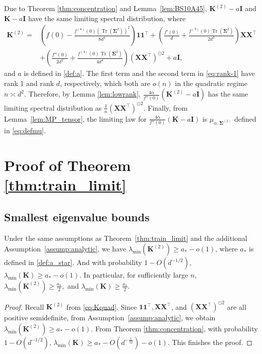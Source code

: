 \documentclass[twoside,11pt]{article}
\def\bI{{\mathbf I}}
\def\bK{{\boldsymbol K}}
\def\bX{{\boldsymbol X}}
\def\bSigma{{\boldsymbol \Sigma}}
\newcommand{\bKquad}{\bK^{(2)}}
\renewcommand{\bK}{\boldsymbol{K}}
\newcommand{\Tr}{\operatorname{Tr}}
\newcommand{\1}{\mathbf{1}}
\def\tran{^\top}
\def\one{\mathbf{1}}
\newenvironment{proofoftheorem}[1]{\par\noindent{\bf Proof of Theorem #1\ }}{\hfill\BlackBox\\[2mm]}
\begin{document}
\begin{proofoftheorem}{\ref{thm:globallaw}}
Due to Theorem \ref{thm:concentration} and Lemma~\ref{lem:BS10A45}, $\bK^{(2)}-a \bI$ and $\bK-a\bI$ have the same limiting spectral distribution, where 
\begin{align} 
\bK^{(2)}=   &\left(f(0)-\frac{f^{(4)}(0)(\Tr(\bSigma^2))^2}{8d^4}\right)\mathbf{1}\mathbf{1}^\top   +\left(\frac{f'(0)}{d}+\frac{f^{(3)}(0)\Tr(\bSigma^2)}{2d^3} \right)\bX\bX ^\top\label{eq:rank-1}\\
& +\left(\frac{f''(0)}{2d^2}+ \frac{f^{(4)}(0)\Tr(\bSigma^2)}{4d^4}\right)   \left(\bX\bX^\top \right)^{\odot 2} + a \bI\label{eq:rank-d},
\end{align}
and $a$ is defined in \eqref{def:a}. The first term and the second term in \eqref{eq:rank-1} have rank 1 and rank $d$, respectively, which both are $o(n)$ in the quadratic regime $n\asymp d^2$. Therefore, by Lemma \ref{lem:lowrank}, $\frac{4\alpha}{f''(0)} \left(\bK^{(2)}-a \bI\right)$ has the same limiting spectral distribution as $\frac{1}{n}\left(\bX \bX^\top\right)^{\odot 2}$. Finally, from Lemma~\ref{lem:MP_tensor}, the limiting law for $\frac{4\alpha}{f''(0)}(\bK-a \bI)$ is $\mu_{\alpha,\bSigma^{(2)}}$ defined in \eqref{eq:defmu}.
\end{proofoftheorem}




\section{Proof of Theorem \ref{thm:train_limit}}\label{sec:krr}



\subsection{Smallest eigenvalue bounds}


\begin{lemma}\label{lem:asym_sigma_min}
Under the same assumptions as Theorem~\ref{thm:train_limit} and the additional Assumption~\ref{assump:analytic}, we have 
$
    \lambda_{\min}(\bK^{(2)})\geq a_{*}-o(1)$,
where $a_*$ is defined in \eqref{def:a_star}.
And with probability $1-O(d^{-1/2})$,
$\lambda_{\min}(\bK)\geq a_{*}-o(1)$.
In particular, for sufficiently large $n$,
$\lambda_{\min}(\bK^{(2)})\geq \frac{a_*}{2},$ and $\lambda_{\min}(\bK)\geq \frac{a_*}{2}$.
\end{lemma}
\begin{proof}
   Recall  $ \bKquad$ from \eqref{eq:Kquad}. 
Since $\one\one\tran, \bX\bX\tran$, and $(\bX\bX\tran)^{\odot 2}$ are all positive semidefinite, from Assumption~\ref{assump:analytic}, we obtain $
    \lambda_{\min}(\bK^{(2)})\geq a_*-o(1)$.
From Theorem \ref{thm:concentration},  with probability $1-O(d^{-1/2})$,
$\lambda_{\min}(\bK)\geq a_{*}-O(d^{-\frac{1}{12}})-o(1)$.
This finishes the proof.
\end{proof}
\end{document}
